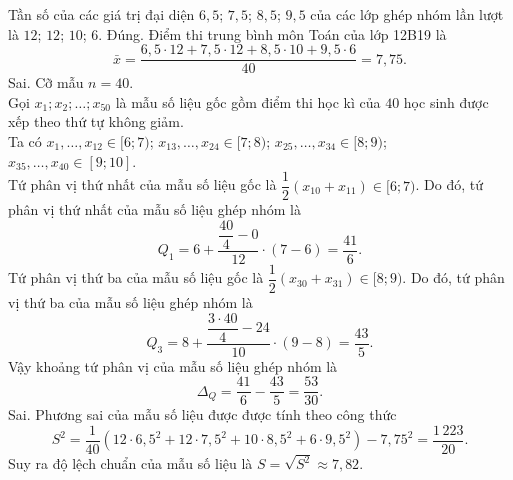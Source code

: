 \begin{ex}
{\begin{itemchoice}
\begin{center}
			\end{center}
		Tần số của các giá trị đại diện $6{,}5$; $7{,}5$; $8{,}5$; $9{,}5$ của các lớp ghép nhóm lần lượt là $12$; $12$; $10$; $6$.
			\itemch Đúng. Điểm thi trung bình môn Toán của lớp 12B19 là
			$$\bar{x}=\dfrac{6{,}5\cdot12+7{,}5\cdot12+8{,}5\cdot10+9{,}5\cdot6}{40}=7{,}75.$$
			\itemch Sai.
			Cỡ mẫu $n=40$.\\
			Gọi $x_1 ; x_2 ; \ldots ; x_{50}$ là mẫu số liệu gốc gồm điểm thi học kì của $40$ học sinh được xếp theo thứ tự không giảm.\\
			Ta có $x_1,\ldots, x_{12} \in[6;7)$; $x_{13}, \ldots, x_{24} \in[7;8)$; $x_{25}, \ldots, x_{34} \in[8;9)$; $x_{35}, \ldots, x_{40} \in[9;10]$.\\
			Tứ phân vị thứ nhất của mẫu số liệu gốc là $\dfrac{1}{2}\left(x_{10}+x_{11}\right) \in[6;7)$. Do đó, tứ phân vị thứ nhất của mẫu số liệu ghép nhóm là
			$$
			Q_1=6+\dfrac{\dfrac{40}{4}-0}{12} \cdot(7-6)=\dfrac{41}{6}.
			$$			
			Tứ phân vị thứ ba của mẫu số liệu gốc là $\dfrac{1}{2}\left(x_{30}+x_{31}\right) \in[8;9)$. Do đó, tứ phân vị thứ ba của mẫu số liệu ghép nhóm là
			$$
			Q_3=8+\dfrac{\dfrac{3\cdot40}{4}-24}{10} \cdot(9-8)=\dfrac{43}{5}.
			$$			
			Vậy khoảng tứ phân vị của mẫu số liệu ghép nhóm là
			$$
			\Delta_Q=\dfrac{41}{6}-\dfrac{43}{5}=\dfrac{53}{30}.
			$$
			\itemch Sai. Phương sai của mẫu số liệu được được tính theo công thức
			$$S^2=\dfrac{1}{40}\left(12\cdot6{,}5^2+12\cdot7{,}5^2+10\cdot8{,}5^2+6\cdot9{,}5^2\right)-7{,}75^2=\dfrac{1\,223}{20}.$$
			Suy ra độ lệch chuẩn của mẫu số liệu là $S=\sqrt{S^2}\approx 7{,}82$.
		\end{itemchoice}
	}
\end{ex}

